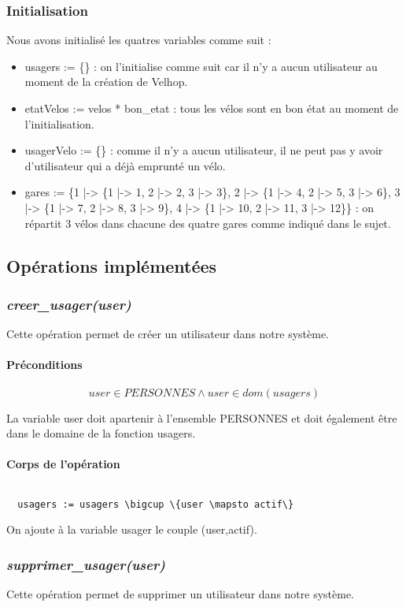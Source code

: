 \documentclass[12pt]{article}
\begin{document}
\subsubsection{Initialisation}
Nous avons initialisé les quatres variables comme suit :
\begin{itemize}
  \item usagers := \{\} : on l'initialise comme suit car il n'y a aucun utilisateur au moment de la création de Velhop.
  \item etatVelos := velos * {bon\_etat} : tous les vélos sont en bon état au moment de l'initialisation.
  \item usagerVelo := \{\} : comme il n'y a aucun utilisateur, il ne peut pas y avoir d'utilisateur qui a déjà emprunté un vélo.
  \item gares := \{1 |-> \{1 |-> 1, 2 |-> 2, 3 |-> 3\}, 2 |-> \{1 |-> 4, 2 |-> 5, 3 |-> 6\}, 3 |-> \{1 |-> 7, 2 |-> 8, 3 |-> 9\}, 4 |-> \{1 |-> 10, 2 |-> 11, 3 |-> 12\}\} : on répartit 3 vélos dans chacune des quatre gares comme indiqué dans le sujet.
\end{itemize}
\subsection{Opérations implémentées}
\subsubsection{\textit{creer\_usager(user)}}
Cette opération permet de créer un utilisateur dans notre système.
\paragraph{Préconditions}
\[user \in PERSONNES \land user \in dom(usagers)\]

La variable user doit apartenir à l'ensemble PERSONNES et doit également être dans le domaine de la fonction usagers.
\paragraph{Corps de l'opération}
\[\]
\begin{lstlisting}
  usagers := usagers \bigcup \{user \mapsto actif\}
\end{lstlisting}

On ajoute à la variable usager le couple (user,actif).
\subsubsection{\textit{supprimer\_usager(user)}}
Cette opération permet de supprimer un utilisateur dans notre système.
\end{document}
